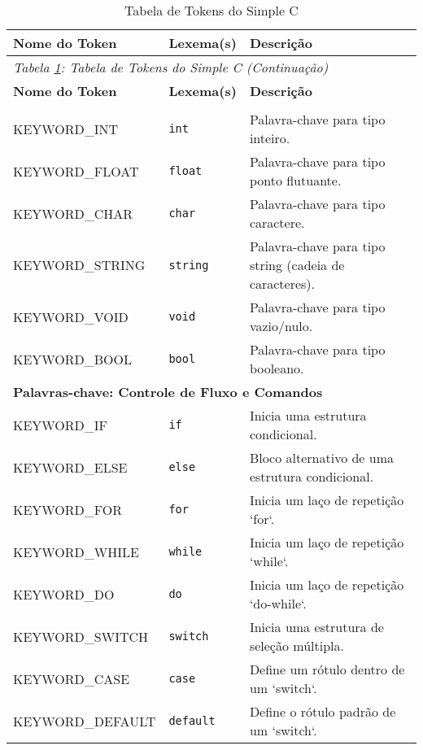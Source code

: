 \documentclass[12pt,a4paper]{article}
\begin{document}
\begin{longtable}{lll}
\caption{Tabela de Tokens do Simple C}
\label{tab:tokens} \\

\toprule
\textbf{Nome do Token} & \textbf{Lexema(s)} & \textbf{Descrição} \\
\midrule
\endfirsthead

\toprule
\multicolumn{3}{l}{\small\textit{Tabela \ref{tab:tokens}: Tabela de Tokens do Simple C (Continuação)}} \\
\textbf{Nome do Token} & \textbf{Lexema(s)} & \textbf{Descrição} \\
\midrule
\endhead

\bottomrule
\endlastfoot

\multicolumn{3}{l}{\textbf{Palavras-chave: Tipos de Dados}} \\
\midrule
KEYWORD\_INT & \texttt{int} & Palavra-chave para tipo inteiro. \\
KEYWORD\_FLOAT & \texttt{float} & Palavra-chave para tipo ponto flutuante. \\
KEYWORD\_CHAR & \texttt{char} & Palavra-chave para tipo caractere. \\
KEYWORD\_STRING & \texttt{string} & Palavra-chave para tipo string (cadeia de caracteres). \\
KEYWORD\_VOID & \texttt{void} & Palavra-chave para tipo vazio/nulo. \\
KEYWORD\_BOOL & \texttt{bool} & Palavra-chave para tipo booleano. \\
\midrule
\multicolumn{3}{l}{\textbf{Palavras-chave: Controle de Fluxo e Comandos}} \\
\midrule
KEYWORD\_IF & \texttt{if} & Inicia uma estrutura condicional. \\
KEYWORD\_ELSE & \texttt{else} & Bloco alternativo de uma estrutura condicional. \\
KEYWORD\_FOR & \texttt{for} & Inicia um laço de repetição `for`. \\
KEYWORD\_WHILE & \texttt{while} & Inicia um laço de repetição `while`. \\
KEYWORD\_DO & \texttt{do} & Inicia um laço de repetição `do-while`. \\
KEYWORD\_SWITCH & \texttt{switch} & Inicia uma estrutura de seleção múltipla. \\
KEYWORD\_CASE & \texttt{case} & Define um rótulo dentro de um `switch`. \\
KEYWORD\_DEFAULT & \texttt{default} & Define o rótulo padrão de um `switch`. \\

\end{longtable}
\end{document}
